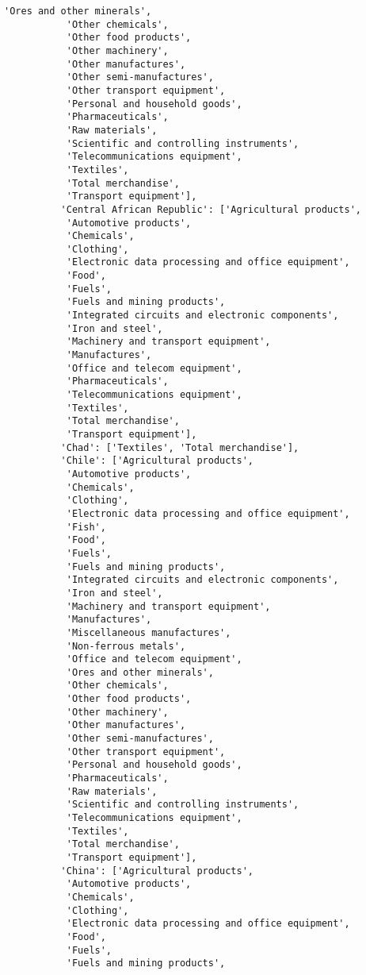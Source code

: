 \documentclass[11pt]{article}
\begin{document}
\begin{Verbatim}[commandchars=\\\{\}]
           'Ores and other minerals',
           'Other chemicals',
           'Other food products',
           'Other machinery',
           'Other manufactures',
           'Other semi-manufactures',
           'Other transport equipment',
           'Personal and household goods',
           'Pharmaceuticals',
           'Raw materials',
           'Scientific and controlling instruments',
           'Telecommunications equipment',
           'Textiles',
           'Total merchandise',
           'Transport equipment'],
          'Central African Republic': ['Agricultural products',
           'Automotive products',
           'Chemicals',
           'Clothing',
           'Electronic data processing and office equipment',
           'Food',
           'Fuels',
           'Fuels and mining products',
           'Integrated circuits and electronic components',
           'Iron and steel',
           'Machinery and transport equipment',
           'Manufactures',
           'Office and telecom equipment',
           'Pharmaceuticals',
           'Telecommunications equipment',
           'Textiles',
           'Total merchandise',
           'Transport equipment'],
          'Chad': ['Textiles', 'Total merchandise'],
          'Chile': ['Agricultural products',
           'Automotive products',
           'Chemicals',
           'Clothing',
           'Electronic data processing and office equipment',
           'Fish',
           'Food',
           'Fuels',
           'Fuels and mining products',
           'Integrated circuits and electronic components',
           'Iron and steel',
           'Machinery and transport equipment',
           'Manufactures',
           'Miscellaneous manufactures',
           'Non-ferrous metals',
           'Office and telecom equipment',
           'Ores and other minerals',
           'Other chemicals',
           'Other food products',
           'Other machinery',
           'Other manufactures',
           'Other semi-manufactures',
           'Other transport equipment',
           'Personal and household goods',
           'Pharmaceuticals',
           'Raw materials',
           'Scientific and controlling instruments',
           'Telecommunications equipment',
           'Textiles',
           'Total merchandise',
           'Transport equipment'],
          'China': ['Agricultural products',
           'Automotive products',
           'Chemicals',
           'Clothing',
           'Electronic data processing and office equipment',
           'Food',
           'Fuels',
           'Fuels and mining products',

\end{Verbatim}
\end{document}
